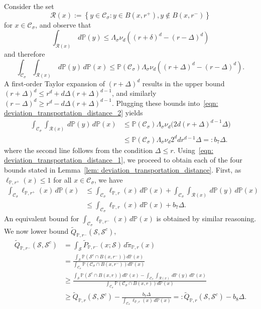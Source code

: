 \documentclass[11pt,twoside]{article}
\theoremstyle{definition}
\newcommand{\set}[1]{\left\{#1\right\}}
\newcommand{\1}{\mathbbm{1}}
\newcommand{\Pbb}{\mathbb{P}}
\newcommand{\Sset}{\mathcal{S}}
\newcommand{\Cset}{\mathcal{C}}
\newcommand{\Csig}{\Cset_{\sigma}}
\begin{document}
Consider the set
\begin{equation*}
\mathcal{R}(x) := \set{y \in \Csig: y \in B(x,r^+), y \not\in B(x,r^-)}
\end{equation*} 
for $x \in \Csig$, and observe that
\begin{equation*}
\int_{\mathcal{R}(x)} \,d\Pbb(y) \leq \Lambda_{\sigma} \nu_d \left((r + \delta)^d - (r - \varDelta)^d\right)
\end{equation*}
and therefore
\begin{equation}
\label{eqn: deviation_transportation_distance_2}
\int_{\Csig} \int_{\mathcal{R}(x)} \,d\Pbb(y) \,d\Pbb(x) \leq \Pbb(\Csig )\Lambda_{\sigma} \nu_d \left((r + \varDelta)^d - (r - \varDelta)^d\right).
\end{equation}
A first-order Taylor expansion of $(r + \varDelta)^d$ results in the upper bound $(r + \varDelta)^d \leq r^d + d\varDelta(r + \varDelta)^{d - 1}$, and similarly $(r - \varDelta)^d \geq r^d - d\varDelta(r + \varDelta)^{d - 1}$. Plugging these bounds into~\eqref{eqn: deviation_transportation_distance_2} yields
\begin{align}
\int_{\Csig} \int_{\mathcal{R}(x)} \,d\Pbb(y) \,d\Pbb(x)  & \leq \Pbb(\Csig) \Lambda_{\sigma} \nu_d \bigl( 2d(r + \Delta)^{d - 1}\varDelta \bigr) \tag{1st-order Taylor expansion of $(r + \Delta)^d$ } \\
& \leq \Pbb(\Csig) \Lambda_{\sigma} \nu_d  2^{d}d r^{d-1}\varDelta =: b_7 \varDelta. \label{eqn: deviation_transportation_distance_1}
\end{align}
where the second line follows from the condition $\Delta \leq r$. Using~\eqref{eqn: deviation_transportation_distance_1}, we proceed to obtain each of the four bounds stated in Lemma~\ref{lem: deviation_transportation_distance}. First, as $\ell_{\Pbb,r^{+}}(x) \leq 1$ for all $x \in \Csig$, we have
\begin{align*}
\int_{\Csig} \ell_{\Pbb,r^+}(x) \,d\Pbb(x) & \leq \int_{\Csig} \ell_{\Pbb,r}(x) \,d\Pbb(x) + \int_{\Csig} \int_{\mathcal{R}(x)} \,d\Pbb(y) \,d\Pbb(x) \\
& \leq \int_{\Csig} \ell_{\Pbb,r}(x) \,d\Pbb(x) + b_7\varDelta.
\end{align*}
An equivalent bound for $\int_{\Csig} \ell_{\Pbb,r^-}(x) \,d\Pbb(x)$ is obtained by similar reasoning. We now lower bound $\widetilde{Q}_{\Pbb,r^{-}}(\Sset, \Sset^c)$,
\begin{align*}
\widetilde{Q}_{\Pbb,r^{-}}(\Sset, \Sset^c) & = \int_{\Sset} \widetilde{P}_{\Pbb,r^-}(x; \Sset) \,d\widetilde{\pi}_{\Pbb,r}(x) \\
& = \frac{\int_{\Sset} \Pbb(\Sset^c \cap B(x,r^-)) d\Pbb(x)}{\int_{\Csig} \Pbb(\Csig \cap B(x,r^-)) d\Pbb(x)} \\
& \geq \frac{\int_{\Sset} \Pbb(\Sset^c \cap B(x,r)) d\Pbb(x) - \int_{\Csig} \int_{\mathcal{R}(x)} \,d\Pbb(y) \,d\Pbb(x)}{\int_{\Csig} \Pbb(\Csig \cap B(x,r)) d\Pbb(x)} \\
& \geq \widetilde{Q}_{\Pbb,r}(\Sset, \Sset^c) - \frac{b_7 \varDelta}{\int_{\Csig}\ell_{\Pbb,r}(x) \,d\Pbb(x)} =:\widetilde{Q}_{\Pbb,r}(\Sset, \Sset^c) - b_8 \varDelta.
\end{align*}
\end{document}
